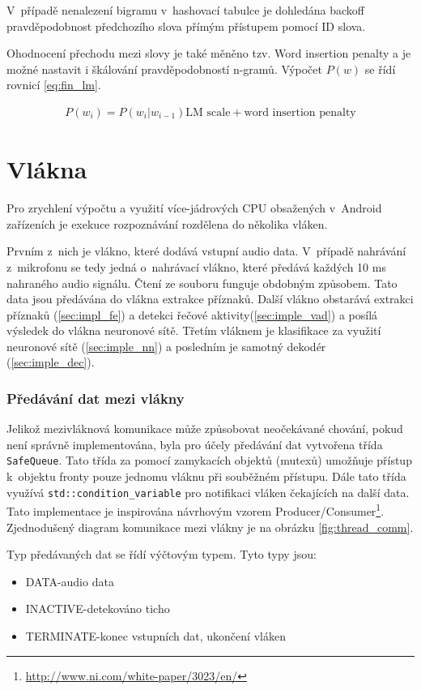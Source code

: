 V~případě nenalezení bigramu v~hashovací tabulce je dohledána backoff pravděpodobnost předchozího slova přímým přístupem pomocí ID slova.

Ohodnocení přechodu mezi slovy je také měněno tzv. Word insertion penalty a je možné nastavit i škálování pravděpodobností n-gramů. Výpočet $P(w)$ se řídí rovnicí \ref{eq:fin_lm}.

\begin{equation} \label{eq:fin_lm}
\begin{gathered}
P(w_i) = P(w_i|w_{i - 1})\text{LM scale} + \text{word insertion penalty}
\end{gathered}
\end{equation}

\section{Vlákna}
Pro zrychlení výpočtu a využití více-jádrových CPU obsažených v~Android zařízeních je exekuce rozpoznávání rozdělena do několika vláken.

Prvním z~nich je vlákno, které dodává vstupní audio data. V~případě nahrávání z~mikrofonu se tedy jedná o~nahrávací vlákno, které předává každých 10 ms nahraného audio signálu. Čtení ze souboru funguje obdobným způsobem. Tato data jsou předávána do vlákna extrakce příznaků. Další vlákno obstarává extrakci příznaků (\ref{sec:impl_fe}) a detekci řečové aktivity(\ref{sec:imple_vad}) a posílá výsledek do vlákna neuronové sítě. Třetím vláknem je klasifikace za využití neuronové sítě (\ref{sec:imple_nn}) a posledním je samotný dekodér (\ref{sec:imple_dec}). 

\subsubsection{Předávání dat mezi vlákny}
Jelikož mezivláknová komunikace může způsobovat neočekávané chování, pokud není správně implementována, byla pro účely předávání dat vytvořena třída \texttt{SafeQueue}. Tato třída za pomocí zamykacích objektů (mutexů) umožňuje přístup k~objektu fronty pouze jednomu vláknu při souběžném přístupu. Dále tato třída využívá \texttt{std::condition\_variable} pro notifikaci vláken čekajících na další data. Tato implementace je inspirována návrhovým vzorem Producer/Consumer\footnote{\url{http://www.ni.com/white-paper/3023/en/}}. Zjednodušený diagram komunikace mezi vlákny je na obrázku \ref{fig:thread_comm}.

Typ předávaných dat se řídí výčtovým typem. Tyto typy jsou:
\begin{itemize}
\item DATA\quad-\quad audio data
\item INACTIVE\quad-\quad detekováno ticho
\item TERMINATE\quad-\quad konec vstupních dat, ukončení vláken
\end{itemize}

